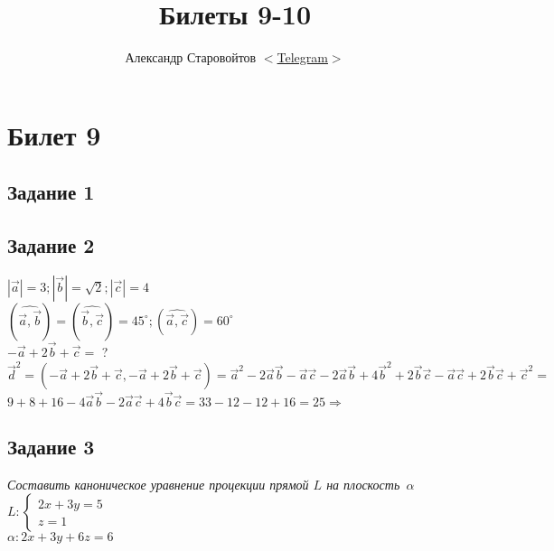 \documentclass[a4paper]{article}
\author{Александр Старовойтов %
$<$\href{https://t.me/stewkk}%
{Telegram}$>$}
\title{Билеты 9-10}
\theoremstyle{definition}
\theoremstyle{plain}
\begin{document}
\maketitle
\section*{Билет 9}
\subsection*{Задание 1}
\subsection*{Задание 2}
$|\vec{a}| = 3; |\vec{b}| = \sqrt{2}; |\vec{c}| = 4$\\
$( \widehat{\vec{a}, \vec{b}} ) = ( \widehat{\vec{b}, \vec{c}} ) = 45^{\circ}; ( \widehat{\vec{a}, \vec{c}} ) = 60^{\circ}$\\
$-\vec{a} + 2 \vec{b} + \vec{c} =$ ?\\

$\vec{d}^{2}=(-\vec{a} + 2 \vec{b} + \vec{c}, -\vec{a} + 2 \vec{b} + \vec{c}) = \vec{a}^{2} -2 \vec{a} \vec{b} - \vec{a} \vec{c} - 2 \vec{a} \vec{b} + 4 \vec{b}^{2} + 2 \vec{b} \vec{c} - \vec{a} \vec{c} + 2 \vec{b} \vec{c} + \vec{c}^{2} =$\\
$9 + 8 + 16 - 4 \vec{a}\vec{b} - 2 \vec{a}\vec{c} + 4 \vec{b}\vec{c} = 33 - 12 - 12 + 16 = 25 \Rightarrow$ 
\subsection*{Задание 3}
\emph{Составить каноническое уравнение процекции прямой $L$ на \mbox{плоскость $\alpha$}}\\
$L: \begin{cases}
  2x + 3y = 5\\
  z = 1
\end{cases}$\\
$\alpha: 2x+3y+6z = 6$
\end{document}
